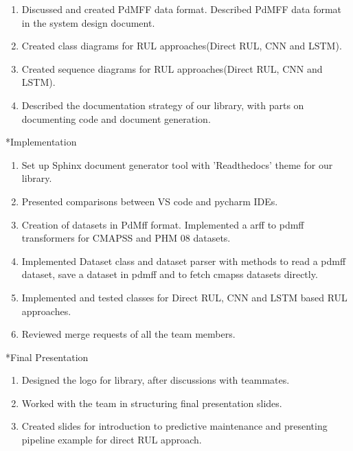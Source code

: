 \documentclass[11pt,a4paper]{article}
\begin{document}
\begin{section}
\begin{refsection}
\begin{subsection}
         \begin{enumerate}
             \item Discussed and created PdMFF data format. Described PdMFF data format in the system design document.
             \item Created class diagrams for RUL approaches(Direct RUL, CNN and LSTM).
             \item Created sequence diagrams for RUL approaches(Direct RUL, CNN and LSTM).
             \item Described the documentation strategy of our library, with parts on documenting code and document generation.
         \end{enumerate}
     \end{subsection}
     \begin{subsection}*{Implementation}
         \begin{enumerate}
             \item Set up Sphinx document generator tool with 'Readthedocs' theme for our library.
             \item Presented comparisons between VS code and pycharm IDEs.
             \item Creation of datasets in PdMff format. Implemented a arff to pdmff transformers for CMAPSS and PHM 08 datasets.
             \item Implemented Dataset class and dataset parser with methods to read a pdmff dataset, save a dataset in pdmff and to fetch cmapss datasets directly.
             \item Implemented and tested classes for Direct RUL, CNN and LSTM based RUL approaches.
             \item Reviewed merge requests of all the team members.
         \end{enumerate}
     \end{subsection}
     \begin{subsection}*{Final Presentation}
         \begin{enumerate}
             \item Designed the logo for library, after discussions with teammates.
             \item Worked with the team in structuring final presentation slides.
             \item Created slides for introduction to predictive maintenance and presenting pipeline example for direct RUL approach.
         \end{enumerate}
     \end{subsection}
 \end{refsection}
\end{section}
\end{document}
